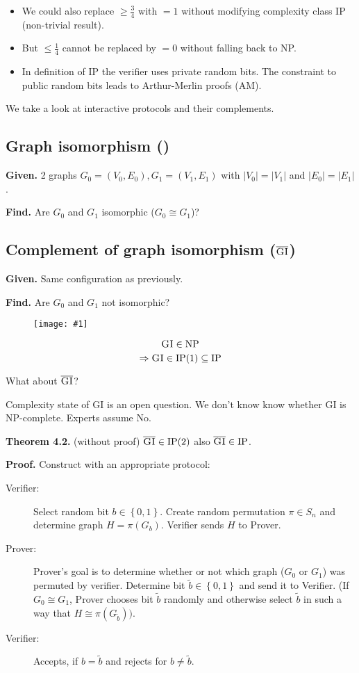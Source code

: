 \documentclass[a4paper]{article}
\newcommand{\drawing}[1]{%
 \begin{figure}[ht]
  \begin{center}
   \texttt{[image: \#1]}
  \end{center}
 \end{figure}
}
\newcommand{\given}[1]{\textbf{Given.} #1\par}
\newcommand{\find}[1]{\textbf{Find.} #1\par}
\newcommand{\cls}[1]{\rm{#1}}
\newcommand{\probl}[1]{\text{\textsc{#1}}}
\newcommand{\set}[1]{\left\{#1\right\}}
\newenvironment{spec}[0]{\begin{framed}}{\end{framed}}
\begin{document}
\begin{itemize}
  \item We could also replace $\geq \frac34$ with $=1$ without modifying
        complexity class \cls{IP} (non-trivial result).
  \item But $\leq \frac14$ cannot be replaced by $=0$ without falling
        back to \cls{NP}.
  \item In definition of \cls{IP} the verifier uses private random bits.
        The constraint to public random bits leads to Arthur-Merlin proofs
        (AM).
\end{itemize}
%
We take a look at interactive protocols and their complements.

\subsection{Graph isomorphism (\probl{GI})}
\label{sec:gi-ip}
%
\begin{spec}
  \given{
    2 graphs $G_0 = (V_0, E_0), G_1 = (V_1, E_1)$ with
    $|V_0| = |V_1|$ and $|E_0| = |E_1|$.
  }
  \find{Are $G_0$ and $G_1$ isomorphic ($G_0 \cong G_1$)?}
\end{spec}

\subsection{Complement of graph isomorphism ($\overline{\probl{GI}}$)}
\label{sec:gic-ip}
%
\begin{spec}
  \given{Same configuration as previously.}
  \find{Are $G_0$ and $G_1$ not isomorphic?}
\end{spec}

\drawing{graph_isomorphism.pdf}

\[
  \probl{GI} \in \cls{NP}
\] \[
  \Rightarrow \probl{GI} \in \cls{IP}(1) \subseteq \cls{IP}
\]

What about $\overline{\probl{GI}}$?

Complexity state of GI is an open question.
We don't know know whether GI is \cls{NP}-complete.
Experts assume No.

\textbf{Theorem 4.2.} (without proof)
  $\overline{\probl{GI}} \in \cls{IP}(2)$ also $\overline{\probl{GI}} \in \cls{IP}$.

\textbf{Proof.}
  Construct with an appropriate protocol:
\begin{description}
  \item[Verifier:] Select random bit $b \in \set{0,1}$.
      Create random permutation $\pi \in S_n$ and determine graph $H = \pi(G_b)$.
      Verifier sends $H$ to Prover.
  \item[Prover:] Prover's goal is to determine whether or not which graph ($G_0$ or $G_1$)
      was permuted by verifier. Determine bit $\tilde{b} \in \set{0,1}$ and send
      it to Verifier. (If $G_0 \cong G_1$, Prover chooses bit $\tilde{b}$ randomly
      and otherwise select $\tilde{b}$ in such a way that $H \cong
      \pi(G_{\tilde{b}}))$.
  \item[Verifier:] Accepts, if $b = \tilde{b}$ and rejects for $b \neq \tilde{b}$.
\end{description}
\end{document}
